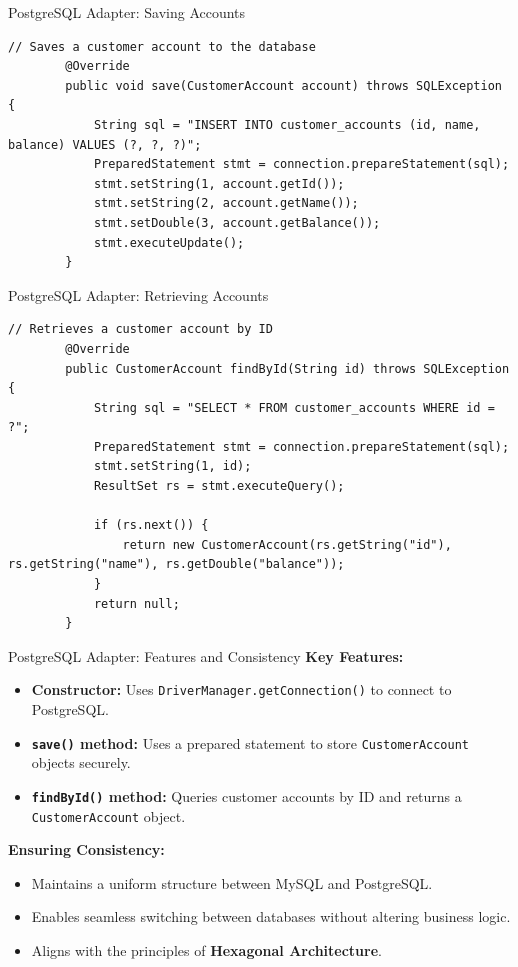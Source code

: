 \documentclass[aspectratio=169, table]{beamer}
\begin{document}
\begin{frame}[fragile]{PostgreSQL Adapter: Saving Accounts}
	\vspace{20pt}
	\begin{lstlisting}[style=JavaStyle]
		// Saves a customer account to the database
		@Override
		public void save(CustomerAccount account) throws SQLException {
			String sql = "INSERT INTO customer_accounts (id, name, balance) VALUES (?, ?, ?)";
			PreparedStatement stmt = connection.prepareStatement(sql);
			stmt.setString(1, account.getId());
			stmt.setString(2, account.getName());
			stmt.setDouble(3, account.getBalance());
			stmt.executeUpdate();
		}
	\end{lstlisting}
\end{frame}

\begin{frame}[fragile]{PostgreSQL Adapter: Retrieving Accounts}
	\vspace{20pt}
	\begin{lstlisting}[style=JavaStyle]
		// Retrieves a customer account by ID
		@Override
		public CustomerAccount findById(String id) throws SQLException {
			String sql = "SELECT * FROM customer_accounts WHERE id = ?";
			PreparedStatement stmt = connection.prepareStatement(sql);
			stmt.setString(1, id);
			ResultSet rs = stmt.executeQuery();
			
			if (rs.next()) {
				return new CustomerAccount(rs.getString("id"), rs.getString("name"), rs.getDouble("balance"));
			}
			return null;
		}
	\end{lstlisting}
\end{frame}


\begin{frame}[fragile]{\LARGE{PostgreSQL Adapter: Features and Consistency}}
	\vspace{20pt}
	\textbf{Key Features:}
	\begin{itemize}
		\item \textbf{Constructor:} Uses \texttt{DriverManager.getConnection()} to connect to PostgreSQL.
		\item \textbf{\texttt{save()} method:} Uses a prepared statement to store \texttt{CustomerAccount} objects securely.
		\item \textbf{\texttt{findById()} method:} Queries customer accounts by ID and returns a \texttt{CustomerAccount} object.
	\end{itemize}
	
	\textbf{Ensuring Consistency:}
	\begin{itemize}
		\item Maintains a uniform structure between MySQL and PostgreSQL.
		\item Enables seamless switching between databases without altering business logic.
		\item Aligns with the principles of \textbf{Hexagonal Architecture}.
	\end{itemize}
\end{frame}
\end{document}
